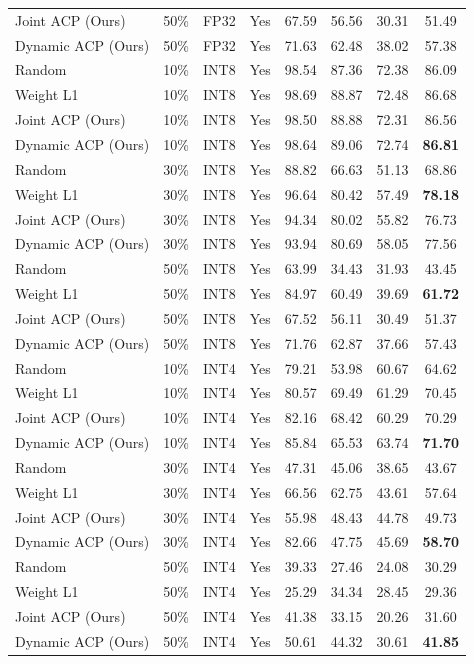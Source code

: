 \documentclass{article}
\theoremstyle{plain}
\theoremstyle{definition}
\theoremstyle{remark}
\begin{document}
\begin{table}[t]
\begin{center}
\begin{small}
\begin{tabular}{lccccccc}
Joint ACP (Ours) & 50\% & FP32 & Yes & 67.59 & 56.56 & 30.31 & 51.49 \\
Dynamic ACP (Ours) & 50\% & FP32 & Yes & 71.63 & 62.48 & 38.02 & 57.38 \\
\midrule
Random & 10\% & INT8 & Yes & 98.54 & 87.36 & 72.38 & 86.09 \\
Weight L1 & 10\% & INT8 & Yes & 98.69 & 88.87 & 72.48 & 86.68 \\
Joint ACP (Ours) & 10\% & INT8 & Yes & 98.50 & 88.88 & 72.31 & 86.56 \\
Dynamic ACP (Ours) & 10\% & INT8 & Yes & 98.64 & 89.06 & 72.74 & \textbf{86.81} \\
\midrule
Random & 30\% & INT8 & Yes & 88.82 & 66.63 & 51.13 & 68.86 \\
Weight L1 & 30\% & INT8 & Yes & 96.64 & 80.42 & 57.49 & \textbf{78.18} \\
Joint ACP (Ours) & 30\% & INT8 & Yes & 94.34 & 80.02 & 55.82 & 76.73 \\
Dynamic ACP (Ours) & 30\% & INT8 & Yes & 93.94 & 80.69 & 58.05 & 77.56 \\
\midrule
Random & 50\% & INT8 & Yes & 63.99 & 34.43 & 31.93 & 43.45 \\
Weight L1 & 50\% & INT8 & Yes & 84.97 & 60.49 & 39.69 & \textbf{61.72} \\
Joint ACP (Ours) & 50\% & INT8 & Yes & 67.52 & 56.11 & 30.49 & 51.37 \\
Dynamic ACP (Ours) & 50\% & INT8 & Yes & 71.76 & 62.87 & 37.66 & 57.43 \\
\midrule
Random & 10\% & INT4 & Yes & 79.21 & 53.98 & 60.67 & 64.62 \\
Weight L1 & 10\% & INT4 & Yes & 80.57 & 69.49 & 61.29 & 70.45 \\
Joint ACP (Ours) & 10\% & INT4 & Yes & 82.16 & 68.42 & 60.29 & 70.29 \\
Dynamic ACP (Ours) & 10\% & INT4 & Yes & 85.84 & 65.53 & 63.74 & \textbf{71.70} \\
\midrule
Random & 30\% & INT4 & Yes & 47.31 & 45.06 & 38.65 & 43.67 \\
Weight L1 & 30\% & INT4 & Yes & 66.56 & 62.75 & 43.61 & 57.64 \\
Joint ACP (Ours) & 30\% & INT4 & Yes & 55.98 & 48.43 & 44.78 & 49.73 \\
Dynamic ACP (Ours) & 30\% & INT4 & Yes & 82.66 & 47.75 & 45.69 & \textbf{58.70} \\
\midrule
Random & 50\% & INT4 & Yes & 39.33 & 27.46 & 24.08 & 30.29 \\
Weight L1 & 50\% & INT4 & Yes & 25.29 & 34.34 & 28.45 & 29.36 \\
Joint ACP (Ours) & 50\% & INT4 & Yes & 41.38 & 33.15 & 20.26 & 31.60 \\
Dynamic ACP (Ours) & 50\% & INT4 & Yes & 50.61 & 44.32 & 30.61 & \textbf{41.85} \\
\bottomrule
\end{tabular}
\end{small}
\end{center}
\end{table}
\end{document}
